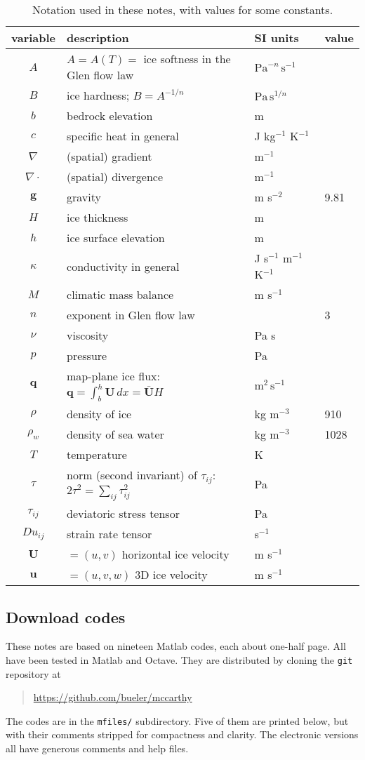 \documentclass[letterpaper,final,12pt,reqno]{amsart}
\newcommand{\bq}{\mathbf{q}}
\newcommand{\bU}{\mathbf{U}}
\begin{document}
\begin{table}[ht]
\caption{Notation used in these notes, with values for some constants.}
\begin{tabular}{clll}
variable  & description & SI units & value \\
\hline
$A$ & $A=A(T)=$ ice softness in the Glen flow law & $\text{Pa}^{-n}\,\text{s}^{-1}$ \\
$B$ & ice hardness; $B=A^{-1/n}$ & $\text{Pa}\,\text{s}^{1/n}$ \\
$b$ & bedrock elevation & m \\
$c$ & specific heat in general & J kg$^{-1}$ K$^{-1}$ \\
$\nabla$ & (spatial) gradient & m$^{-1}$ \\
$\nabla\cdot$ & (spatial) divergence & m$^{-1}$ \\
$\mathbf{g}$ & gravity & m s$^{-2}$\phantom{foobar} & 9.81 \\
$H$ & ice thickness & m \\
$h$ & ice surface elevation & m \\
$\kappa$ & conductivity in general & J s$^{-1}$ m$^{-1}$ K$^{-1}$ \\
$M$ & climatic mass balance & m s$^{-1}$ \\
$n$ & exponent in Glen flow law & & 3 \\
$\nu$ & viscosity & Pa s \\
$p$ & pressure & Pa \\
$\bq$ & map-plane ice flux: $\bq = \int_{b}^{h} \bU\,dx = \bar{\bU} H$ & $\text{m}^2\,\text{s}^{-1}$ \\
$\rho$ & density of ice & kg m$^{-3}$ & 910 \\
$\rho_w$ & density of sea water & kg m$^{-3}$ & 1028 \\
$T$ & temperature & K \\
$\tau$ & norm (second invariant) of $\tau_{ij}$: $2 \tau^2 = \sum_{ij} \tau_{ij}^2$ & Pa \\
$\tau_{ij}$ & deviatoric stress tensor & Pa \\
$Du_{ij}$ & strain rate tensor & s$^{-1}$ \\
$\mathbf{U}$ & $=(u,v)$ horizontal ice velocity & m s$^{-1}$ \\
$\mathbf{u}$ & $=(u,v,w)$ 3D ice velocity & m s$^{-1}$ \\
\end{tabular}
\label{tab:notation}
\end{table}

\subsection*{Download codes}  These notes are based on nineteen Matlab codes, each about one-half page.  All have been tested in Matlab and Octave.  They are distributed by cloning the \texttt{git} repository at
\begin{quote}
\url{https://github.com/bueler/mccarthy}
\end{quote}
\noindent The codes are in the \texttt{mfiles/} subdirectory.  Five of them are printed below, but with their comments stripped for compactness and clarity.  The electronic versions all have generous comments and help files.
\end{document}
